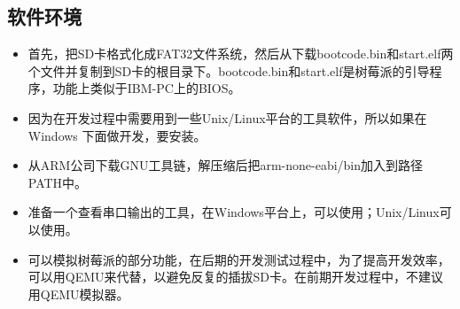 \documentclass[main.tex]{subfiles}
\begin{document}
\begin{CJK*}{UTF8}{song}
\subsection{软件环境}
\begin{itemize}
\item 首先，把SD卡格式化成FAT32文件系统，然后从下载bootcode.bin和start.elf两个文件并复制到SD卡的根目录下。bootcode.bin和start.elf是树莓派的引导程序，功能上类似于IBM-PC上的BIOS。
\item 因为在开发过程中需要用到一些Unix/Linux平台的工具软件，所以如果在 Windows 下面做开发，要安装。
\item 从ARM公司下载GNU工具链，解压缩后把arm-none-eabi/bin加入到路径PATH中。
\item 准备一个查看串口输出的工具，在Windows平台上，可以使用；Unix/Linux可以使用。
\item {}可以模拟树莓派的部分功能，在后期的开发测试过程中，为了提高开发效率，可以用QEMU来代替，以避免反复的插拔SD卡。在前期开发过程中，不建议用QEMU模拟器。
\end{itemize}

\clearpage
\ifxetex\else\end{CJK*}\fi
\end{document}
